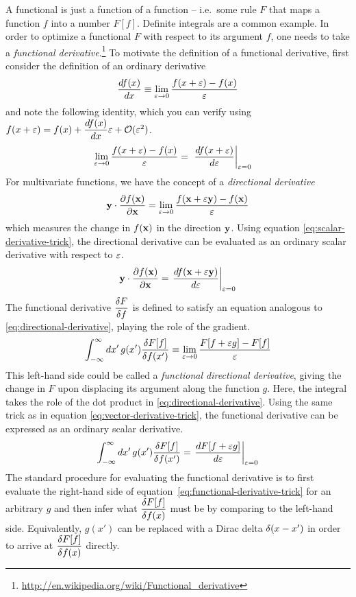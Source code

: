 \documentclass[11pt]{article}
\numberwithin{equation}{section}
\begin{document}
A functional is just a function of a function -- i.e.\ some rule $F$ that maps a function $f$ into a number $F[f]$.  Definite integrals are a common example.
In order to optimize a functional $F$ with respect to its argument $f$, one needs to take a \textit{functional derivative}.\footnote{\url{http://en.wikipedia.org/wiki/Functional_derivative}}
To motivate the definition of a functional derivative, first consider the definition of an ordinary derivative
\begin{align}
  \frac {d f(x)}{d x}
\equiv
  \lim_{\varepsilon\rightarrow0}
  \frac {f(x+\varepsilon)-f(x)}{\varepsilon}
\end{align}
and note the following identity, which you can verify using
$
  f(x+\varepsilon)
=
  f(x)
+
  \dfrac{d f(x)}{d x}
  \varepsilon
+
  \mathcal{O}(\varepsilon^2)
$.
\begin{align}\label{eq:scalar-derivative-trick}
  \lim_{\varepsilon\rightarrow0}
  \frac {f(x+\varepsilon)-f(x)}{\varepsilon}
=&\
\left.
  \frac {df(x+\varepsilon)}{d\varepsilon}
\right|_{\varepsilon=0}
\end{align}
For multivariate functions, we have the concept of a \textit{directional derivative}
\begin{align}\label{eq:directional-derivative}
  \mathbf{y}\cdot
  \frac {\partial f(\mathbf{x})}{\partial\mathbf{x}}
=
  \lim_{\varepsilon\rightarrow0}
  \frac {f(\mathbf{x}+\varepsilon\mathbf{y}) - f(\mathbf{x})}{\varepsilon}
\end{align}
which measures the change in $f(\mathbf{x})$ in the direction $\mathbf{y}$.
Using equation \ref{eq:scalar-derivative-trick}, the directional derivative can be evaluated as an ordinary scalar derivative with respect to $\varepsilon$.
\begin{align}\label{eq:vector-derivative-trick}
  \mathbf{y}\cdot
  \frac {\partial f(\mathbf{x})}{\partial\mathbf{x}}
=
  \left.
  \frac {d f(\mathbf{x} + \varepsilon\mathbf{y})}{d \varepsilon}
  \right|_{\varepsilon=0}
\end{align}
The functional derivative $\dfrac{\delta  F}{\delta  f}$ is defined to satisfy an equation analogous to \ref{eq:directional-derivative}, playing the role of the gradient.
\begin{align}
  \int_{-\infty}^{\infty}
  dx'\,
  g(x')
  \frac {\delta  F[f]}{\delta  f(x')}
\equiv
  \lim_{\varepsilon\rightarrow0}
  \frac {F[f+\varepsilon g] - F[f]}{\varepsilon}
\end{align}
This left-hand side could be called a \textit{functional directional derivative}, giving the change in $F$ upon displacing its argument along the function $g$.
Here, the integral takes the role of the dot product in \ref{eq:directional-derivative}.
Using the same trick as in equation \ref{eq:vector-derivative-trick}, the functional derivative can be expressed as an ordinary scalar derivative.
\begin{align}
\label{eq:functional-derivative-trick}
  \int_{-\infty}^{\infty}
  dx'\,
  g(x')
  \frac {\delta  F[f]}{\delta  f(x')}
=
  \left.
  \frac {d F[f+\varepsilon g]}{d \varepsilon}
  \right|_{\varepsilon=0}
\end{align}
The standard procedure for evaluating the functional derivative is to first evaluate the right-hand side of equation~\ref{eq:functional-derivative-trick} for an arbitrary $g$ and then infer what $\dfrac{\delta  F[f]}{\delta  f(x)}$ must be by comparing to the left-hand side.
Equivalently, $g(x')$ can be replaced with a Dirac delta $\delta (x-x')$ in order to arrive at $\dfrac{\delta  F[f]}{\delta  f(x)}$ directly.
\end{document}
